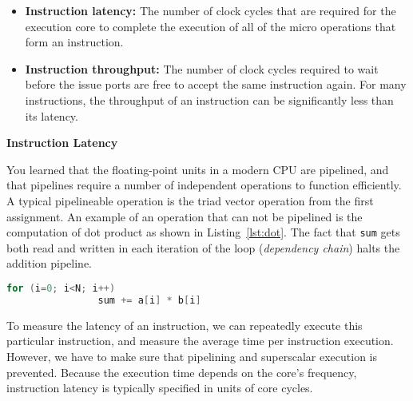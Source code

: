 \documentclass[a4paper,12pt]{exam}
\begin{document}
\begin{itemize}
	\item \textbf{Instruction latency:} The number of clock cycles that are required for the execution core to complete the
	execution of all of the micro operations that form an instruction.
	\item \textbf{Instruction throughput:} The number of clock cycles required to wait before the issue ports are free to accept
	the same instruction again. For many instructions, the throughput of an instruction can be significantly less than its latency.
\end{itemize}

\begin{questions}
	\question \textbf{Instruction Latency} \label{q:instruction-latency}
	
	You learned that the floating-point units in a modern CPU are pipelined, and that pipelines
	require a number of independent operations to function efficiently. A typical pipelineable operation is
	the triad vector operation from the first assignment. An example of an operation that can not be pipelined is the computation of dot product as shown in Listing~\ref{lst:dot}.
	The fact that \texttt{sum} gets both read and written in each iteration of the loop (\textit{dependency chain}) halts the addition pipeline.
	
	\begin{minipage}[c]{0.95\textwidth}
		\begin{lstlisting}[language=C, numberstyle=\small, numbersep=8pt, captionpos=b, caption=Dot product, frame=single, label=lst:dot]	
			for (i=0; i<N; i++)
			    sum += a[i] * b[i]
		\end{lstlisting}
	\end{minipage}
	
	To measure the latency of an instruction, we can repeatedly execute this particular instruction, and measure the average time per instruction execution. 
	However, we have to make sure that pipelining and superscalar execution is prevented.
	Because the execution time depends on the core's frequency, instruction latency is typically specified in units of core cycles.

\end{questions}
\end{document}
